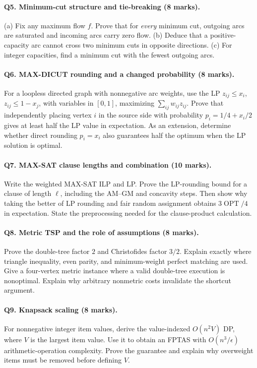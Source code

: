\documentclass[10pt]{article}
\theoremstyle{definition}
\newcommand{\OPT}{\operatorname{OPT}}
\begin{document}
\paragraph{Q5. Minimum-cut structure and tie-breaking (8 marks).}
(a) Fix any maximum flow $f$.  Prove that for \emph{every} minimum cut,
outgoing arcs are saturated and incoming arcs carry zero flow.
(b) Deduce that a positive-capacity arc cannot cross two minimum cuts in
opposite directions.  (c) For integer capacities, find a minimum cut with
the fewest outgoing arcs.

\paragraph{Q6. MAX-DICUT rounding and a changed probability (8 marks).}
For a loopless directed graph with nonnegative arc weights, use the LP
$z_{ij}\le x_i$, $z_{ij}\le1-x_j$, with variables in $[0,1]$, maximizing
$\sum_{ij}w_{ij}z_{ij}$.  Prove that independently placing vertex $i$ in
the source side with probability $p_i=1/4+x_i/2$ gives at least half the
LP value in expectation.  As an extension, determine whether direct
rounding $p_i=x_i$ also guarantees half the optimum when the LP solution
is optimal.

\paragraph{Q7. MAX-SAT clause lengths and combination (10 marks).}
Write the weighted MAX-SAT ILP and LP.  Prove the LP-rounding bound for a
clause of length $\ell$, including the AM--GM and concavity steps.  Then
show why taking the better of LP rounding and fair random assignment
obtains $3\OPT/4$ in expectation.  State the preprocessing needed for
the clause-product calculation.

\paragraph{Q8. Metric TSP and the role of assumptions (8 marks).}
Prove the double-tree factor $2$ and Christofides factor $3/2$.  Explain
exactly where triangle inequality, even parity, and minimum-weight perfect
matching are used.  Give a four-vertex metric instance where a valid
double-tree execution is nonoptimal.  Explain why arbitrary nonmetric
costs invalidate the shortcut argument.

\paragraph{Q9. Knapsack scaling (8 marks).}
For nonnegative integer item values, derive the value-indexed $O(n^2V)$ DP,
where $V$ is the largest item value.  Use it to obtain an FPTAS with
$O(n^3/\epsilon)$ arithmetic-operation complexity.  Prove the guarantee
and explain why overweight items must be removed before defining $V$.
\end{document}
